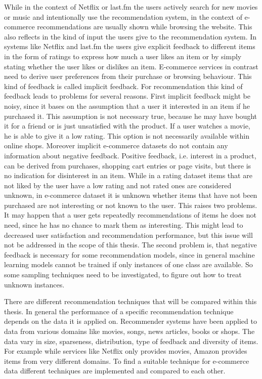 \documentclass[10pt]{reportMaster}
\begin{document}
While in the context of Netflix or last.fm the users actively search for new movies or music and intentionally use the recommendation system, in the context of e-commerce recommendations are usually shown while browsing the website.
This also reflects in the kind of input the users give to the recommendation system.
In systems like Netflix and last.fm the users give explicit feedback to different items in the form of ratings to express how much a user likes an item or by simply stating whether the user likes or dislikes an item.
E-commerce services in contrast need to derive user preferences from their purchase or browsing behaviour.
This kind of feedback is called implicit feedback.
For recommendation this kind of feedback leads to problems for several reasons.
First implicit feedback might be noisy, since it bases on the assumption that a user it interested in an item if he purchased it.
This assumption is not necessary true, because he may have bought it for a friend or is just unsatisfied with the product.
If a user watches a movie, he is able to give it a low rating.
This option is not necessarily available within online shops.
Moreover implicit e-commerce datasets do not contain any information about negative feedback.
Positive feedback, i.e. interest in a product, can be derived from purchases, shopping cart entries or page visits, but there is no indication for disinterest in an item.
While in a rating dataset items that are not liked by the user have a low rating and not rated ones are considered unknown, in e-commerce dataset it is unknown whether items that have not been purchased are not interesting or not known to the user.
This raises two problems.
It may happen that a user gets repeatedly recommendations of items he does not need, since he has no chance to mark them as interesting.
This might lead to decreased user satisfaction and recommendation performance, but this issue will not be addressed in the scope of this thesis.
The second problem is, that negative feedback is necessary for some recommendation models, since in general machine learning models cannot be trained if only instances of one class are available.
So some sampling techniques need to be investigated, to figure out how to treat unknown instances.

There are different recommendation techniques that will be compared within this thesis.
In general the performance of a specific recommendation technique depends on the data it is applied on.
Recommender systems have been applied to data from various domains like movies, songs, news articles, books or shops.
The data vary in size, sparseness, distribution, type of feedback and diversity of items.
For example while services like Netflix only provides movies, Amazon provides items from very different domains.
To find a suitable technique for e-commerce data different techniques are implemented and compared to each other.
\end{document}
